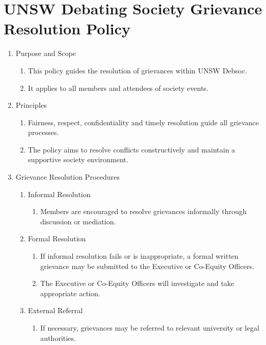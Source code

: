 \newpage
\section{UNSW Debating Society Grievance Resolution Policy}

\begin{enumerate}
\item Purpose and Scope
  \begin{enumerate}
  \item This policy guides the resolution of grievances within UNSW Debsoc.
  \item It applies to all members and attendees of society events.
  \end{enumerate}

\item Principles
  \begin{enumerate}
  \item Fairness, respect, confidentiality and timely resolution guide all grievance processes.
  \item The policy aims to resolve conflicts constructively and maintain a supportive society environment.
  \end{enumerate}

\item Grievance Resolution Procedures
  \begin{enumerate}
  \item Informal Resolution
    \begin{enumerate}
    \item Members are encouraged to resolve grievances informally through discussion or mediation.
    \end{enumerate}
  \item Formal Resolution
    \begin{enumerate}
    \item If informal resolution fails or is inappropriate, a formal written grievance may be submitted to the Executive or Co-Equity Officers.
    \item The Executive or Co-Equity Officers will investigate and take appropriate action.
    \end{enumerate}
  \item External Referral
    \begin{enumerate}
    \item If necessary, grievances may be referred to relevant university or legal authorities.
    \end{enumerate}
  \end{enumerate}


\end{enumerate}
